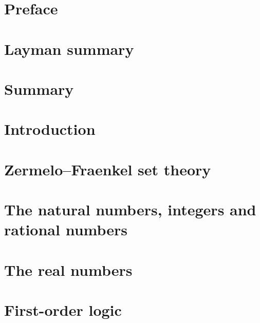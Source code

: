 \documentclass[10pt, a4paper]{report}
\theoremstyle{definition}
\begin{document}
\setcounter{page}{5}

\chapter*{Preface}\label{chap:preface}

\newpage

\chapter*{Layman summary}\label{chap:layman_summary}

\newpage

\chapter*{Summary}\label{chap:summary}

\newpage

\chapter*{Introduction}\label{chap:introduction}

\newpage

\tableofcontents
\newpage


\chapter{Zermelo–Fraenkel set theory}\label{chap:zermelo_fraenkel_set_theory}

\newpage

\chapter{The natural numbers, integers and rational numbers}\label{chap:the_natural_numbers_integers_and_rational_numbers}

\newpage

\chapter{The real numbers}\label{chap:the_real_numbers}

\newpage

\printbibliography[title={Bibliography}]

\appendix

\chapter{First-order logic}\label{app:first_order_logic}

\end{document}
